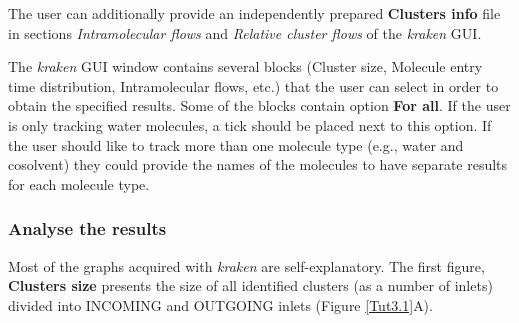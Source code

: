\documentclass[9pt,tutorial, pubversion]{livecoms}
\begin{document}
The user can additionally provide an independently prepared \textbf{Clusters info} file in sections \textit{Intramolecular flows} and \textit{Relative cluster flows} of the \textit{kraken} GUI. 

The \textit{kraken} GUI window contains several blocks (Cluster size, Molecule entry time distribution, Intramolecular flows, etc.) that the user can select in order to obtain the specified results. Some of the blocks contain option \textbf{For all}. If the user is only tracking water molecules, a tick should be placed next to this option. If the user should like to track more than one molecule type (e.g., water and cosolvent) they could provide the names of the molecules to have separate results for each molecule type. 

\subsubsection{Analyse the results}
Most of the graphs acquired with \textit{kraken} are self-explanatory. 
The first figure, \textbf{Clusters size} presents the size of all identified clusters (as a number of inlets) divided into INCOMING and OUTGOING inlets (Figure \ref{Tut3.1}A).
\end{document}
